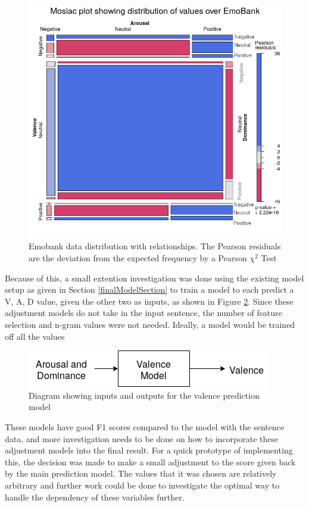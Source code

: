 \begin{figure}[ht]
\centering
\includegraphics[scale=0.7]{graphs/mosaic_new.png}
\caption{Emobank data distribution with relationships. The Pearson residuals are the deviation from the expected frequency by a Pearson $\chi^2$ Test \cite{pearson1900x}}
\label{mosaic:emo}
\end{figure}

Because of this, a small extention investigation was done using the existing model setup as given in Section \ref{finalModelSection} to train a model to each predict a V, A, D value, given the other two as inputs, as shown in Figure \ref{model:adjust}. Since these adjustment models do not take in the input sentence, the number of feature selection and n-gram values were not needed. Ideally, a model would be trained off all the values 

\begin{figure}[ht]
\centering
\includegraphics[scale=0.6]{implementation/adjustModel.png}
\caption{Diagram showing inputs and outputs for the valence prediction model}
\label{model:adjust}
\end{figure}

These models have good F1 scores compared to the model with the sentence data, and more investigation needs to be done on how to incorporate these adjustment models into the final result. For a quick prototype of implementing this, the decision was made to make a small adjustment to the score given back by the main prediction model. The values that it was chosen are relatively arbitrary and further work could be done to investigate the optimal way to handle the dependency of these variables further.


